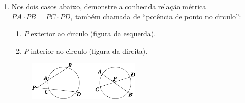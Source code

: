 \documentclass[a4paper,5pt]{amsbook}
\begin{document}
\begin{enumerate}
    \item Nos dois casos abaixo, demonstre a conhecida rela\c{c}\~ao m\'etrica
        $\overline{PA} \cdot \overline{PB} = \overline{PC} \cdot
        \overline{PD}$, tamb\'em chamada de ``pot\^encia de ponto no c\'{\i}rculo'':
        \begin{enumerate}
            \vspace{0.3cm}
            \item $P$ exterior ao c\'{\i}rculo (figura da esquerda).
            \vspace{0.3cm}
            \item $P$ interior ao c\'{\i}rculo (figura da direita).
        \end{enumerate}
        \begin{figure}[!h]
            \centering
            \includegraphics[width=0.5\textwidth]{fig05-5.pdf}
        \end{figure}
\end{enumerate}
\end{document}
